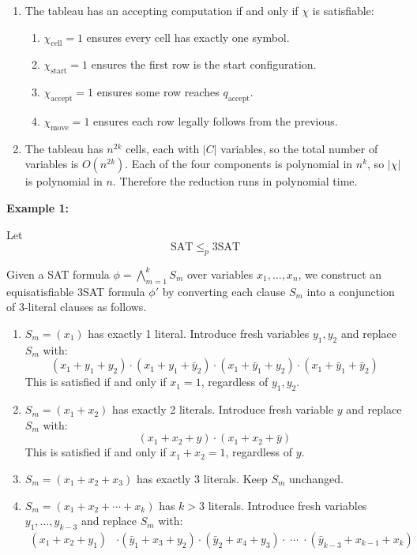 \documentclass[12pt,a4paper,openany]{article}
\begin{document}
\begin{enumerate}
\begin{enumerate}
\begin{center}
\begin{tabular}{ccc}
        \end{tabular}
        \end{center}
    \end{enumerate}

    \item The tableau has an accepting computation if and only if $\chi$ is satisfiable:
    \begin{enumerate}
        \item $\chi_{\text{cell}} = 1$ ensures every cell has exactly one symbol.
        \item $\chi_{\text{start}} = 1$ ensures the first row is the start configuration.
        \item $\chi_{\text{accept}} = 1$ ensures some row reaches $q_{\text{accept}}$.
        \item $\chi_{\text{move}} = 1$ ensures each row legally follows from the previous.
    \end{enumerate}

    \item The tableau has $n^{2k}$ cells, each with $|C|$ variables, so the total number of variables is $O(n^{2k})$. Each of the four components is polynomial in $n^k$, so $|\chi|$ is polynomial in $n$. 
    Therefore the reduction runs in polynomial time.
\end{enumerate}


\textbf{Example 1:}

Let \[\mathrm{SAT} \leq_p \mathrm{3SAT}\]

Given a SAT formula $\phi = \displaystyle\bigwedge_{m=1}^{k} S_m$ over variables $x_1, \ldots, x_n$, we construct
an equisatisfiable 3SAT formula $\phi'$ by converting each clause $S_m$ into a conjunction of
3-literal clauses as follows.

\begin{enumerate}
    \item $S_m = (x_1)$ has exactly 1 literal. Introduce fresh variables $y_1, y_2$ and replace $S_m$ with:
    \[
    (x_1 + y_1 + y_2) \cdot (x_1 + y_1 + \bar{y}_2) \cdot (x_1 + \bar{y}_1 + y_2) \cdot (x_1 + \bar{y}_1 + \bar{y}_2)
    \]
    This is satisfied if and only if $x_1 = 1$, regardless of $y_1, y_2$.

    \item $S_m = (x_1 + x_2)$ has exactly 2 literals. Introduce fresh variable $y$ and replace $S_m$ with:
    \[
    (x_1 + x_2 + y) \cdot (x_1 + x_2 + \bar{y})
    \]
    This is satisfied if and only if $x_1 + x_2 = 1$, regardless of $y$.

    \item $S_m = (x_1 + x_2 + x_3)$ has exactly 3 literals. Keep $S_m$ unchanged.

    \item $S_m = (x_1 + x_2 + \cdots + x_k)$ has $k > 3$ literals. Introduce fresh
    variables $y_1, \ldots, y_{k-3}$ and replace $S_m$ with:
    \begin{align*}
    (x_1 + x_2 + y_1) &\cdot (\bar{y}_1 + x_3 + y_2) \cdot (\bar{y}_2 + x_4 + y_3) \cdot \; \cdots \; \cdot (\bar{y}_{k-3} + x_{k-1} + x_k)
    \end{align*}
\end{enumerate}
\end{document}
